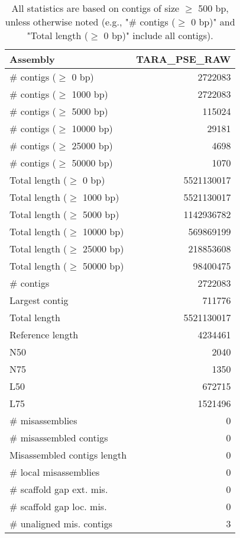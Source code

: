 \documentclass[12pt,a4paper]{article}
\begin{document}
\begin{table}[ht]
\begin{center}
\caption{All statistics are based on contigs of size $\geq$ 500 bp, unless otherwise noted (e.g., "\# contigs ($\geq$ 0 bp)" and "Total length ($\geq$ 0 bp)" include all contigs).}
\begin{tabular}{|l*{1}{|r}|}
\hline
Assembly & TARA\_PSE\_RAW \\ \hline
\# contigs ($\geq$ 0 bp) & 2722083 \\ \hline
\# contigs ($\geq$ 1000 bp) & 2722083 \\ \hline
\# contigs ($\geq$ 5000 bp) & 115024 \\ \hline
\# contigs ($\geq$ 10000 bp) & 29181 \\ \hline
\# contigs ($\geq$ 25000 bp) & 4698 \\ \hline
\# contigs ($\geq$ 50000 bp) & 1070 \\ \hline
Total length ($\geq$ 0 bp) & 5521130017 \\ \hline
Total length ($\geq$ 1000 bp) & 5521130017 \\ \hline
Total length ($\geq$ 5000 bp) & 1142936782 \\ \hline
Total length ($\geq$ 10000 bp) & 569869199 \\ \hline
Total length ($\geq$ 25000 bp) & 218853608 \\ \hline
Total length ($\geq$ 50000 bp) & 98400475 \\ \hline
\# contigs & 2722083 \\ \hline
Largest contig & 711776 \\ \hline
Total length & 5521130017 \\ \hline
Reference length & 4234461 \\ \hline
N50 & 2040 \\ \hline
N75 & 1350 \\ \hline
L50 & 672715 \\ \hline
L75 & 1521496 \\ \hline
\# misassemblies & 0 \\ \hline
\# misassembled contigs & 0 \\ \hline
Misassembled contigs length & 0 \\ \hline
\# local misassemblies & 0 \\ \hline
\# scaffold gap ext. mis. & 0 \\ \hline
\# scaffold gap loc. mis. & 0 \\ \hline
\# unaligned mis. contigs & 3 \\ \hline

\end{tabular}
\end{center}
\end{table}
\end{document}
